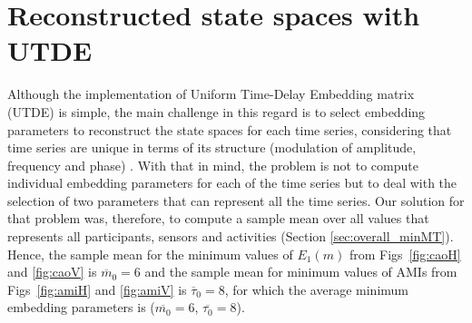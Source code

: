 \section{Reconstructed state spaces with UTDE}
Although the implementation of Uniform Time-Delay Embedding matrix (UTDE) 
is simple, the main challenge in this regard is to select embedding parameters 
to reconstruct the state spaces for each time series, considering that time 
series are unique in terms of its structure (modulation of amplitude, 
frequency and phase) \citep{ frank2010, sama2013, bradley2015}.
With that in mind, the problem is not to compute individual embedding 
parameters for each of the time series but to deal with the selection of 
two parameters that can represent all the time series. 
Our solution for that problem was, therefore, to compute a sample mean over 
all values that represents all participants, sensors and activities 
(Section \ref{sec:overall_minMT}).
Hence, the sample mean for the minimum values of $E_{1}(m)$ from 
Figs~\ref{fig:caoH} and \ref{fig:caoV} is $\overline{m}_0=6$ and the sample 
mean for minimum values of AMIs from Figs~\ref{fig:amiH} and \ref{fig:amiV} 
is $\overline{\tau}_0=8$, for which the average minimum embedding parameters 
is ($\overline{m_0}=6$, $\overline{\tau_0}=8$).

